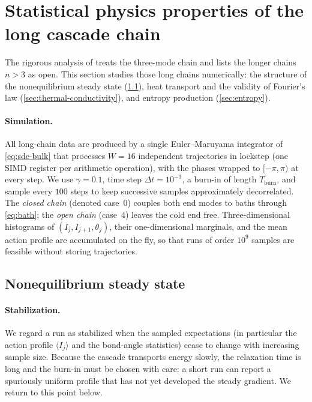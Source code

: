 \documentclass[11pt,a4paper]{article}
\theoremstyle{definition}
\numberwithin{equation}{section}   %
\begin{document}
\section{Statistical physics properties of the long cascade chain}\label{sec:long-chain}

The rigorous analysis of \cite{HLNS} treats the three-mode chain and lists the
longer chains $n>3$ as open. This section studies those long chains
numerically: the structure of the nonequilibrium steady state
(\cref{sec:ness-long}), heat transport and the validity of Fourier's law
(\cref{sec:thermal-conductivity}), and entropy production
(\cref{sec:entropy}).

\paragraph{Simulation.}
All long-chain data are produced by a single Euler--Maruyama integrator of
\eqref{eq:sde-bulk} that processes $W=16$ independent trajectories in lockstep
(one SIMD register per arithmetic operation), with the phases wrapped to
$[-\pi,\pi)$ at every step. We use $\gamma=0.1$, time step $\Delta t=10^{-3}$,
a burn-in of length $T_{\mathrm{burn}}$, and sample every $100$ steps to keep
successive samples approximately decorrelated. The \emph{closed chain} (denoted
case~$0$) couples both end modes to baths through \eqref{eq:bath}; the
\emph{open chain} (case~$4$) leaves the cold end free. Three-dimensional
histograms of $(I_j,I_{j+1},\theta_j)$, their one-dimensional marginals, and the
mean action profile are accumulated on the fly, so that runs of order $10^9$
samples are feasible without storing trajectories.

\subsection{Nonequilibrium steady state}\label{sec:ness-long}

\paragraph{Stabilization.}
We regard a run as stabilized when the sampled expectations (in particular the
action profile $\langle I_j\rangle$ and the bond-angle statistics) cease to
change with increasing sample size. Because the cascade transports energy
slowly, the relaxation time is long and the burn-in must be chosen with care:
a short run can report a spuriously uniform profile that has not yet developed
the steady gradient. We return to this point below.
\end{document}
